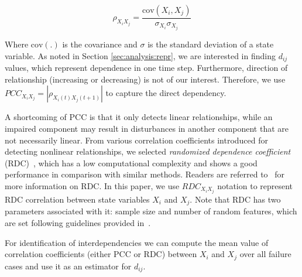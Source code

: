 \documentclass[12pt]{elsarticle}
\begin{document}
\begin{equation}
\label{eqn:pearson}
\rho_{X_i X_j} = \dfrac{\text{cov}(X_i, X_j)}{\sigma_{X_i} \sigma_{X_j}}
\end{equation}

Where $\text{cov}(.)$ is the covariance and $\sigma$ is the standard deviation of a state variable. As noted in Section \ref{sec:analysis:repr}, we are interested in finding $d_{ij}$ values, which represent dependence in one time step. Furthermore, direction of relationship (increasing or decreasing) is not of our interest. Therefore, we use $PCC_{X_i X_j} = |\rho_{X_i(t) X_j(t + 1)}|$ to capture the direct dependency.

A shortcoming of PCC is that it only detects linear relationships, while an impaired component may result in disturbances in another component that are not necessarily linear. From various correlation coefficients introduced for detecting nonlinear relationships, we selected \emph{randomized dependence coefficient} (RDC)~\cite{LoH13}, which has a low computational complexity and shows a good performance in comparison with similar methods. Readers are referred to~\cite{LoH13} for more information on RDC. In this paper, we use $RDC_{X_i X_j}$ notation to represent RDC correlation between state variables $X_i$ and $X_j$. Note that RDC has two parameters associated with it: sample size and number of random features, which are set following guidelines provided in~\cite{LoH13}.

For identification of interdependencies we can compute the mean value of correlation coefficients (either PCC or RDC) between $X_i$ and $X_j$ over all failure cases and use it as an estimator for $d_{ij}$.%

\end{document}
